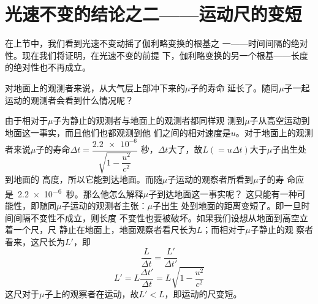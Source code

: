 \section{光速不变的结论之二——运动尺的变短}\label{sec:02.08}

在上节中，我们看到光速不变动摇了伽利略变换的根基之
一——时间间隔的绝对性。现在我们将证明，在光速不变的前提
下，伽利略变换的另一个根基——长度的绝对性也不再成立。

对地面上的观测者来说，从大气层上部冲下来的$ \mu $子的寿命
延长了。随同$ \mu $子一起运动的观测者会看到什么情况呢？

由于相对于$ \mu $子为静止的观测者与地面上的观测者都同样观
测到$ \mu $子从高空运动到地面这一事实，而且他们也都观测到他
们之间的相对速度是$u$。对于地面上的观测者来说$\mu$子的寿命$\Delta t = \dfrac{\num{2.2e-6}}{\sqrt{1 - \dfrac{u ^ 2}{c ^ 2}}}$
秒，$\Delta t$大了，故$ L \left( = u \Delta t \right)$大于$\mu$子出生处到地面的
高度，所以它能到达地面。而随$\mu$子运动的观察者所看到$\mu$子的寿
命应是~\num{2.2e-6}~秒。那么他怎么解释$\mu$子到达地面这一事实呢？
这只能有一种可能性，即随同$\mu$子运动的观测者主张：$\mu$子出生
处到地面的距离变短了。即一旦时间间隔不变性不成立，则长度
不变性也要被破坏。如果我们设想从地面到高空立着一个尺，尺
静止在地面上，地面观察者看尺长为$L$；而相对于$\mu$子静止的观
察者看来，这尺长为$L'$，即
\begin{equation*}
  \frac { L } { \Delta t } = \frac { L ' } { \Delta t ' }
\end{equation*}
\begin{equation}\label{eqn:02.08.01}
  L ' = L \frac { \Delta t ' } { \Delta t } = L \sqrt { 1 - \frac { u ^ { 2 } } { c ^ { 2 } } }
\end{equation}
这尺对于$\mu$子上的观察者在运动，故$ L ' < L $，即运动的尺变短。

